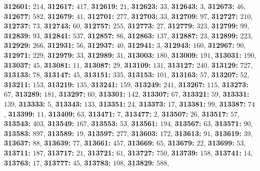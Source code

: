 \textsf{\bfseries 312601:} $214$, \textsf{\bfseries 312617:} $417$, \textsf{\bfseries 312619:} $21$, \textsf{\bfseries 312623:} $33$, \textsf{\bfseries 312643:} $3$, \textsf{\bfseries 312673:} $46$, \textsf{\bfseries 312677:} $582$, \textsf{\bfseries 312679:} $41$, \textsf{\bfseries 312701:} $277$, \textsf{\bfseries 312703:} $33$, \textsf{\bfseries 312709:} $97$, \textsf{\bfseries 312727:} $210$, \textsf{\bfseries 312737:} $73$, \textsf{\bfseries 312743:} $60$, \textsf{\bfseries 312757:} $255$, \textsf{\bfseries 312773:} $27$, \textsf{\bfseries 312779:} $323$, \textsf{\bfseries 312799:} $99$, \textsf{\bfseries 312839:} $93$, \textsf{\bfseries 312841:} $537$, \textsf{\bfseries 312857:} $86$, \textsf{\bfseries 312863:} $137$, \textsf{\bfseries 312887:} $23$, \textsf{\bfseries 312899:} $223$, \textsf{\bfseries 312929:} $266$, \textsf{\bfseries 312931:} $56$, \textsf{\bfseries 312937:} $40$, \textsf{\bfseries 312941:} $3$, \textsf{\bfseries 312943:} $160$, \textsf{\bfseries 312967:} $90$, \textsf{\bfseries 312971:} $229$, \textsf{\bfseries 312979:} $33$, \textsf{\bfseries 312989:} $31$, \textsf{\bfseries 313003:} $180$, \textsf{\bfseries 313009:} $191$, \textsf{\bfseries 313031:} $190$, \textsf{\bfseries 313037:} $45$, \textsf{\bfseries 313081:} $11$, \textsf{\bfseries 313087:} $29$, \textsf{\bfseries 313109:} $131$, \textsf{\bfseries 313127:} $240$, \textsf{\bfseries 313129:} $727$, \textsf{\bfseries 313133:} $78$, \textsf{\bfseries 313147:} $45$, \textsf{\bfseries 313151:} $335$, \textsf{\bfseries 313153:} $101$, \textsf{\bfseries 313163:} $57$, \textsf{\bfseries 313207:} $52$, \textsf{\bfseries 313211:} $153$, \textsf{\bfseries 313219:} $135$, \textsf{\bfseries 313241:} $159$, \textsf{\bfseries 313249:} $241$, \textsf{\bfseries 313267:} $115$, \textsf{\bfseries 313273:} $67$, \textsf{\bfseries 313289:} $181$, \textsf{\bfseries 313297:} $60$, \textsf{\bfseries 313301:} $142$, \textsf{\bfseries 313307:} $67$, \textsf{\bfseries 313321:} $59$, \textsf{\bfseries 313331:} $139$, \textsf{\bfseries 313333:} $5$, \textsf{\bfseries 313343:} $133$, \textsf{\bfseries 313351:} $24$, \textsf{\bfseries 313373:} $17$, \textsf{\bfseries 313381:} $99$, \textsf{\bfseries 313387:} $74$, \textsf{\bfseries 313399:} $11$, \textsf{\bfseries 313409:} $63$, \textsf{\bfseries 313471:} $7$, \textsf{\bfseries 313477:} $2$, \textsf{\bfseries 313507:} $26$, \textsf{\bfseries 313517:} $57$, \textsf{\bfseries 313543:} $403$, \textsf{\bfseries 313549:} $167$, \textsf{\bfseries 313553:} $53$, \textsf{\bfseries 313561:} $194$, \textsf{\bfseries 313567:} $63$, \textsf{\bfseries 313571:} $90$, \textsf{\bfseries 313583:} $897$, \textsf{\bfseries 313589:} $19$, \textsf{\bfseries 313597:} $277$, \textsf{\bfseries 313603:} $172$, \textsf{\bfseries 313613:} $91$, \textsf{\bfseries 313619:} $39$, \textsf{\bfseries 313637:} $88$, \textsf{\bfseries 313639:} $77$, \textsf{\bfseries 313661:} $457$, \textsf{\bfseries 313669:} $65$, \textsf{\bfseries 313679:} $22$, \textsf{\bfseries 313699:} $53$, \textsf{\bfseries 313711:} $187$, \textsf{\bfseries 313717:} $21$, \textsf{\bfseries 313721:} $61$, \textsf{\bfseries 313727:} $750$, \textsf{\bfseries 313739:} $158$, \textsf{\bfseries 313741:} $14$, \textsf{\bfseries 313763:} $17$, \textsf{\bfseries 313777:} $45$, \textsf{\bfseries 313783:} $108$, \textsf{\bfseries 313829:} $588$, 
